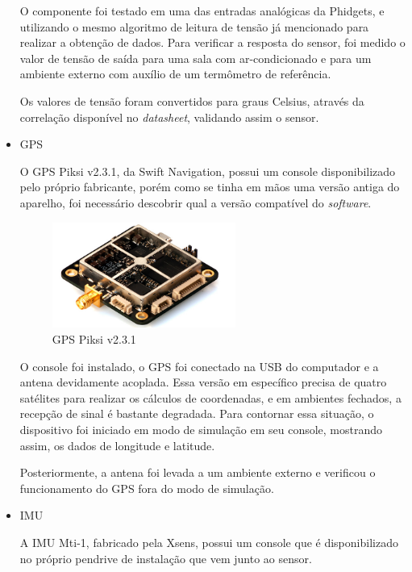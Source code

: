 \begin{itemize}
O componente foi testado em uma das entradas analógicas da Phidgets, e utilizando o mesmo algoritmo de leitura de tensão já mencionado para realizar a obtenção de dados. Para verificar a resposta do sensor, foi medido o valor de tensão de saída para uma sala com ar-condicionado e para um ambiente externo com auxílio de um termômetro de referência.

Os valores de tensão foram convertidos para graus Celsius, através da correlação disponível no \textit{datasheet}, validando assim o sensor.

\item GPS

O GPS Piksi v2.3.1, da Swift Navigation, possui um console disponibilizado pelo próprio fabricante, porém como se tinha em mãos uma versão antiga do aparelho, foi necessário descobrir qual a versão compatível do \textit{software}.

\begin{figure}[!ht]
	\centering
	\includegraphics[width=6cm]{Figures/gps.jpg}
	\caption{GPS Piksi v2.3.1}
	\label{fig:GPS}
\end{figure}

O console foi instalado, o GPS foi conectado na USB do computador e a antena devidamente acoplada. Essa versão em específico precisa de quatro satélites para realizar os cálculos de coordenadas, e em ambientes fechados, a recepção de sinal é bastante degradada. Para contornar essa situação, o dispositivo foi iniciado em modo de simulação em seu console, mostrando assim, os dados de longitude e latitude.

Posteriormente, a antena foi levada a um ambiente externo e verificou o funcionamento do GPS fora do modo de simulação.    

\item IMU

A IMU Mti-1, fabricado pela Xsens, possui um console que é disponibilizado no próprio pendrive de instalação que vem junto ao sensor.


\end{itemize}
